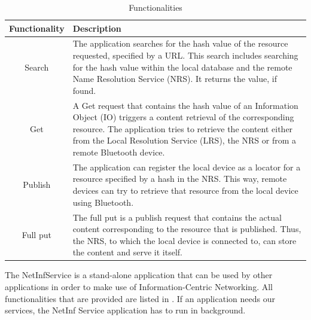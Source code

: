 \begin{table}
\centering
 \begin{tabular}{|c|p{10cm}|}\hline
  Functionality	& Description \\\hline
  Search	& The application searches for the hash value of the resource requested, specified by a URL. This search includes
		  searching for the hash value within the local database and the remote Name Resolution Service (NRS).
		  It returns the value, if found.\\\hline
  Get		& A Get request that contains the hash value of an Information Object (IO) triggers a content retrieval of the
		  corresponding resource. The application tries to retrieve the content either from the Local Resolution Service (LRS), the NRS
		  or from a remote Bluetooth device.\\\hline
  Publish	& The application can register the local device as a locator for a resource specified by a hash in the NRS. This way, remote
		  devices can try to retrieve that resource from the local device using Bluetooth. \\\hline
  Full put	& The full put is a publish request that contains the actual content corresponding to the resource that is published. Thus,
		  the NRS, to which the local device is connected to, can store the content and serve it itself.\\\hline
		  
 \end{tabular}
  \caption{Functionalities}\label{tab:netinffunctionalities}
\end{table}

The NetInfService is a stand-alone application that can be used by other
applications in order to make use of Information-Centric Networking. All functionalities
that are provided are listed in . If an application
needs our services, the NetInf Service application has to run in background.\\

